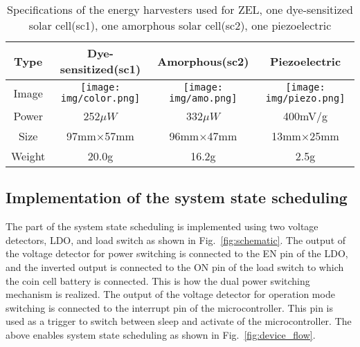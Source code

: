 \documentclass[conference]{IEEEtran}
\begin{document}
\begin{table}[bt]
    \centering
    \caption{Specifications of the energy harvesters used for ZEL, one dye-sensitized solar cell(sc1), one amorphous solar cell(sc2), one piezoelectric}
    \begin{tabular}{cccc} \hline
        Type   & Dye-sensitized(sc1) & Amorphous(sc2) & Piezoelectric \\ \hline \hline
        Image   & 
        \begin{minipage}{20mm}
            \centering
            \texttt{[image: img/color.png]}
        \end{minipage} &
        \begin{minipage}{20mm}
            \centering
            \texttt{[image: img/amo.png]}
        \end{minipage} &
        \begin{minipage}{10mm}
            \centering
            \texttt{[image: img/piezo.png]}
        \end{minipage} \\ \hline
        Power   & 252$\mu W$ & 332$\mu W$ & 400mV/g \\ \hline
        Size & 97mm$\times$57mm & 96mm$\times$47mm & 13mm$\times$25mm \\ \hline
        Weight & 20.0g & 16.2g & 2.5g \\ \hline
    \end{tabular}
    \label{tab:specification_of_harvesters}
\end{table}

\subsection{Implementation of the system state scheduling}
The part of the system state scheduling is implemented using two voltage detectors, LDO, and load switch as shown in Fig.~\ref{fig:schematic}.
The output of the voltage detector for power switching is connected to the EN pin of the LDO, and the inverted output is connected to the ON pin of the load switch to which the coin cell battery is connected.
This is how the dual power switching mechanism is realized.
The output of the voltage detector for operation mode switching is connected to the interrupt pin of the microcontroller.
This pin is used as a trigger to switch between sleep and activate of the microcontroller.
The above enables system state scheduling as shown in Fig.~\ref{fig:device_flow}.
\end{document}
